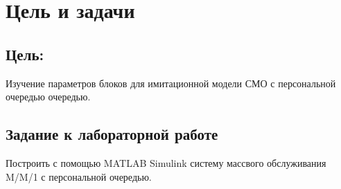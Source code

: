 \chapter{Цель и задачи}
\label{ch:intro}

\section*{\textbf{Цель:}} 

Изучение параметров блоков для имитационной модели
СМО с персональной очередью очередью.

\section*{Задание к лабораторной работе}

Построить с помощью MATLAB Simulink систему массвого обслуживания M/M/1 с персональной очередью.


\endinput